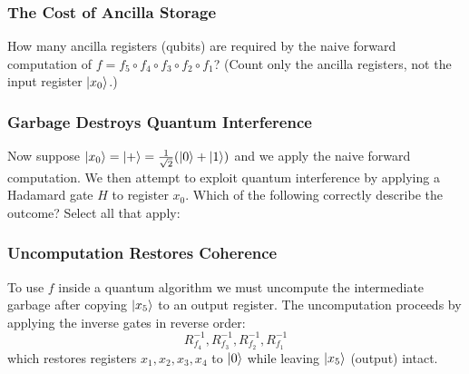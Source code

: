 \subsubsection{The Cost of Ancilla Storage}
How many ancilla registers (qubits) are required by the naive forward computation of $f = f_5 \circ f_4 \circ f_3 \circ f_2 \circ f_1 $? (Count only the ancilla registers, not the input register $\ket{x_0}$.) \\
\noindent{} 


\subsubsection{Garbage Destroys Quantum Interference}
Now suppose $\ket{x_0} = \ket{+} = \frac{1}{\sqrt{2}}(\ket{0} + \ket{1})$ and we apply the naive forward computation. We then attempt to exploit quantum interference by applying a Hadamard gate $H$ to register $x_0$. Which of the following correctly describe the outcome? Select all that apply: \\
\noindent{} 





\subsubsection{Uncomputation Restores Coherence}
To use $f$ inside a quantum algorithm we must uncompute the intermediate garbage after copying $\ket{x_5}$ to an output register. The uncomputation proceeds by applying the inverse gates in reverse order:
\begin{equation}
    R_{f_4}^{-1}, R_{f_3}^{-1}, R_{f_2}^{-1}, R_{f_1}^{-1}
\end{equation}
which restores registers $x_1, x_2, x_3, x_4$ to $\ket{0}$ while leaving $\ket{x_5}$ (output) intact. \\

